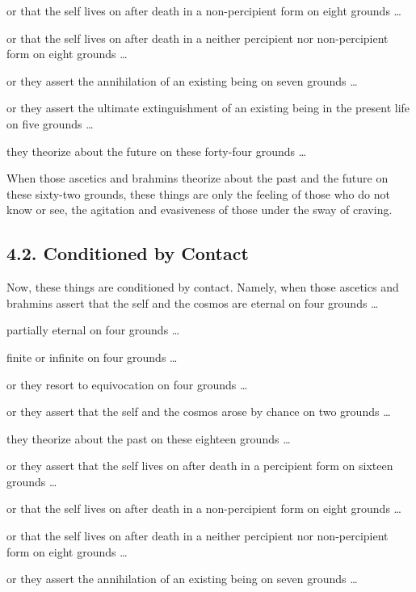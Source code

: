 \documentclass[12pt,openany]{book}%
\begin{document}
or that the self lives on after death in a non-percipient form on eight grounds … 

or that the self lives on after death in a neither percipient nor non-percipient form on eight grounds … 

or they assert the annihilation of an existing being on seven grounds … 

or they assert the ultimate extinguishment of an existing being in the present life on five grounds … 

they theorize about the future on these forty-four grounds … 

When those ascetics and brahmins theorize about the past and the future on these sixty-two grounds, these things are only the feeling of those who do not know or see, the agitation and evasiveness of those under the sway of craving. 

\subsection*{4.2. Conditioned by Contact }

Now, these things are conditioned by contact. Namely, when those ascetics and brahmins assert that the self and the cosmos are eternal on four grounds … 

partially eternal on four grounds … 

finite or infinite on four grounds … 

or they resort to equivocation on four grounds … 

or they assert that the self and the cosmos arose by chance on two grounds … 

they theorize about the past on these eighteen grounds … 

or they assert that the self lives on after death in a percipient form on sixteen grounds … 

or that the self lives on after death in a non-percipient form on eight grounds … 

or that the self lives on after death in a neither percipient nor non-percipient form on eight grounds … 

or they assert the annihilation of an existing being on seven grounds … 
\end{document}
